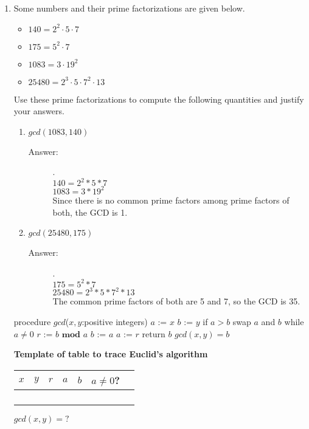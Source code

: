 \documentclass[12pt, oneside]{article}
\begin{document}
\begin{enumerate}
\item Some numbers and their prime factorizations are given below.
\begin{itemize}
    \item $140 = 2^2 \cdot 5 \cdot 7$
    \item $175 = 5^2 \cdot 7$
    \item $1083 = 3 \cdot 19^2$
    \item $25480 = 2^3 \cdot 5 \cdot 7^2 \cdot 13$
\end{itemize}

Use these prime factorizations to compute the following quantities and justify your answers.
\begin{enumerate}
    \item $gcd(1083,140)$
    \begin{description}
    \item[Answer:] .\\
        $140=2^2 * 5 * 7$\\
        $1083=3*19^2$\\
        Since there is no common prime factors among prime factors of both, the GCD is 1.
    \end{description}
    \item $gcd(25480,175)$
    \begin{description}
    \item[Answer:] .\\
        $175=5^2 * 7$\\
        $25480=2^3*5*7^2*13$\\
        The common prime factors of both are 5 and 7, so the GCD is 35.
    \end{description}
\end{enumerate}




\begin{algorithm}[caption={Euclid's algorithm in pseudocode}]
procedure $\textit{gcd}$($x, y$:positive integers)
$a$ := $x$
$b$ := $y$
if $a > b$
  swap $a$ and $b$
while $a\neq 0$
  $r$ := $b \textbf{ mod } a$
  $b$ := $a$
  $a$ := $r$
return $b$ {$gcd(x, y) = b$} 
\end{algorithm}

{\bf{Template of table to trace Euclid's algorithm}}

\begin{minipage}{3.2in}
\begin{tabular}{c|c|c|c|c|c|c|}
$x$ & $y$  & $r$ & $a$ & $b$ & $a \neq 0$?\\
\hline 
 &  &  &  &  &\\
 &  &  &  &  &\\
 &  &  &  &  &\\
 &  &  &  &  &\\
\end{tabular}
$gcd( x , y) = ?$
\end{minipage}


\end{enumerate}
\end{document}
